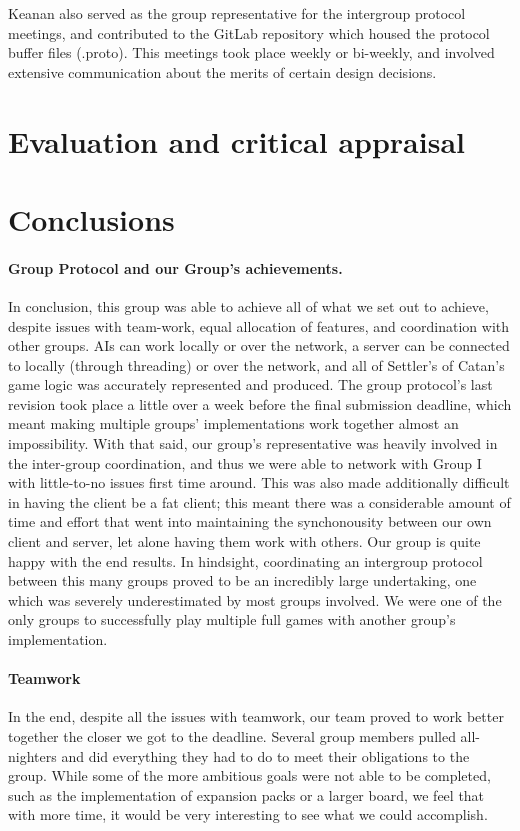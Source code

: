 \documentclass[a4paper,doc]{apa6}
\begin{document}
Keanan also served as the group representative for the intergroup protocol meetings, and contributed to the GitLab repository which housed the protocol buffer files (.proto). This meetings took place weekly or bi-weekly, and involved extensive communication about the merits of certain design decisions. 

\section{Evaluation and critical appraisal}

\section{Conclusions}
\paragraph{Group Protocol and our Group's achievements.}
In conclusion, this group was able to achieve all of what we set out to achieve, despite issues with team-work, equal allocation of features, and coordination with other groups. AIs can work locally or over the network, a server can be connected to locally (through threading) or over the network, and all of Settler's of Catan's game logic was accurately represented and produced. The group protocol's last revision took place a little over a week before the final submission deadline, which meant making multiple groups' implementations work together almost an impossibility. With that said, our group's representative was heavily involved in the inter-group coordination, and thus we were able to network with Group I with little-to-no issues first time around. This was also made additionally difficult in having the client be a fat client; this meant there was a considerable amount of time and effort that went into maintaining the synchonousity between our own client and server, let alone having them work with others. Our group is quite happy with the end results. In hindsight, coordinating an intergroup protocol between this many groups proved to be an incredibly large undertaking, one which was severely underestimated by most groups involved. We were one of the only groups to successfully play multiple full games with another group's implementation. 

\paragraph{Teamwork}
In the end, despite all the issues with teamwork, our team proved to work better together the closer we got to the deadline. Several group members pulled all-nighters and did everything they had to do to meet their obligations to the group. While some of the more ambitious goals were not able to be completed, such as the implementation of expansion packs or a larger board, we feel that with more time, it would be very interesting to see what we could accomplish.   
\end{document}
